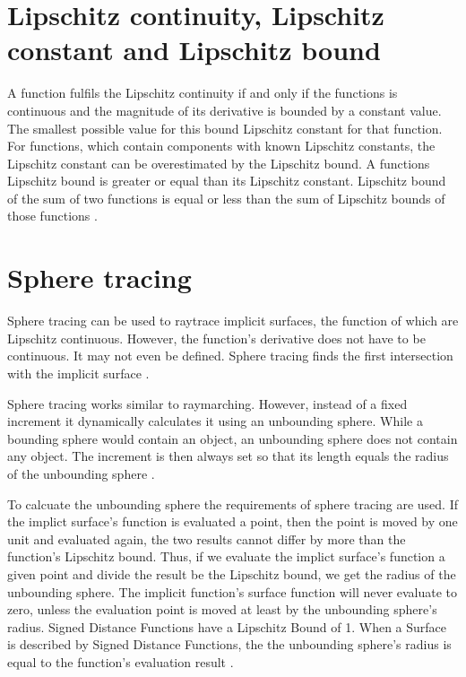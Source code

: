 \section{Lipschitz continuity, Lipschitz constant and Lipschitz bound}
A function fulfils the Lipschitz continuity if and only if the functions is continuous and the magnitude of its derivative is bounded by a constant value. The smallest possible value for this bound Lipschitz constant for that function. For functions, which contain components with known Lipschitz constants, the Lipschitz constant can be overestimated by the Lipschitz bound. A functions Lipschitz bound is greater or equal than its Lipschitz constant. Lipschitz bound of the sum of two functions is equal or less than the sum of Lipschitz bounds of those functions 
\cite{hart:1996:sphere} \cite{Heuser:2003}.

\section{Sphere tracing}
Sphere tracing can be used to raytrace implicit surfaces, the function of which are Lipschitz continuous. However, the function's derivative does not have to be continuous. It may not even be defined. Sphere tracing finds the first intersection with the implicit surface \cite{hart:1996:sphere}.

Sphere tracing works similar to raymarching. However, instead of a fixed increment it dynamically calculates it using an unbounding sphere. While a bounding sphere would contain an object, an unbounding sphere does not contain any object. The increment is then always set so that its length equals the radius of the unbounding sphere \cite{hart:1996:sphere}.

To calcuate the unbounding sphere the requirements of sphere tracing are used. If the implict surface's function is evaluated a point, then the point is moved by one unit and evaluated again, the two results cannot differ by more than the function's Lipschitz bound. Thus, if we evaluate the implict surface's function a given point and divide the result be the Lipschitz bound, we get the radius of the unbounding sphere. The implicit function's surface function will never evaluate to zero, unless the evaluation point is moved at least by the unbounding sphere's radius. Signed Distance Functions have a Lipschitz Bound of 1. When a Surface is described by Signed Distance Functions, the the unbounding sphere's radius is equal to the function's evaluation result \cite{hart:1996:sphere}.

